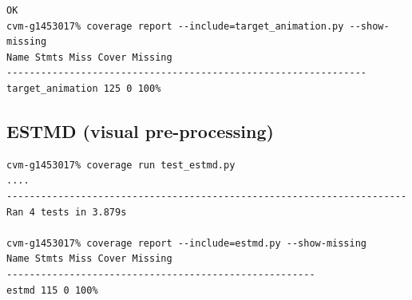 \documentclass[a4paper,11pt]{article}
\begin{document}
\begin{appendices}
\begin{verbatim}
OK
cvm-g1453017% coverage report --include=target_animation.py --show-missing
Name Stmts Miss Cover Missing
---------------------------------------------------------------
target_animation 125 0 100%
\end{verbatim}
\subsection{ESTMD (visual pre-processing)}
\begin{verbatim}
cvm-g1453017% coverage run test_estmd.py
....
----------------------------------------------------------------------
Ran 4 tests in 3.879s

cvm-g1453017% coverage report --include=estmd.py --show-missing
Name Stmts Miss Cover Missing
------------------------------------------------------
estmd 115 0 100% 
\end{verbatim}
\end{appendices}
\end{document}
